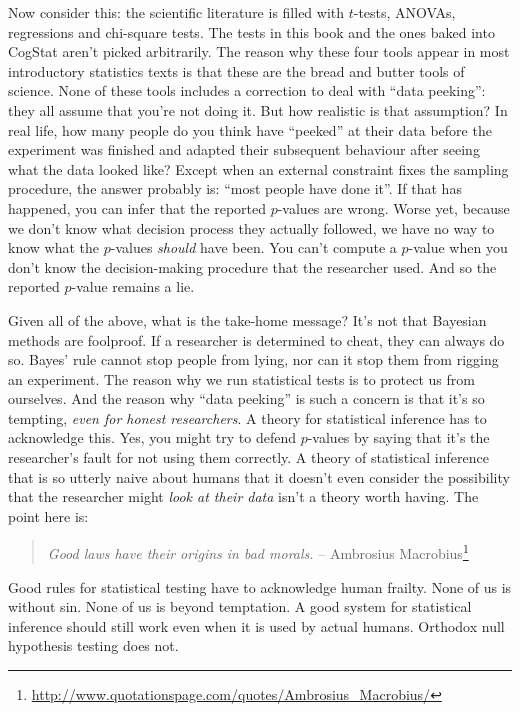 \documentclass[
]{book}
\theoremstyle{definition}
\theoremstyle{definition}
\theoremstyle{definition}
\theoremstyle{definition}
\theoremstyle{remark}
\begin{document}
Now consider this: the scientific literature is filled with \(t\)-tests, ANOVAs, regressions and chi-square tests. The tests in this book and the ones baked into CogStat aren't picked arbitrarily. The reason why these four tools appear in most introductory statistics texts is that these are the bread and butter tools of science. None of these tools includes a correction to deal with ``data peeking'': they all assume that you're not doing it. But how realistic is that assumption? In real life, how many people do you think have ``peeked'' at their data before the experiment was finished and adapted their subsequent behaviour after seeing what the data looked like? Except when an external constraint fixes the sampling procedure, the answer probably is: ``most people have done it''. If that has happened, you can infer that the reported \(p\)-values are wrong. Worse yet, because we don't know what decision process they actually followed, we have no way to know what the \(p\)-values \emph{should} have been. You can't compute a \(p\)-value when you don't know the decision-making procedure that the researcher used. And so the reported \(p\)-value remains a lie.

Given all of the above, what is the take-home message? It's not that Bayesian methods are foolproof. If a researcher is determined to cheat, they can always do so. Bayes' rule cannot stop people from lying, nor can it stop them from rigging an experiment. The reason why we run statistical tests is to protect us from ourselves. And the reason why ``data peeking'' is such a concern is that it's so tempting, \emph{even for honest researchers}. A theory for statistical inference has to acknowledge this. Yes, you might try to defend \(p\)-values by saying that it's the researcher's fault for not using them correctly. A theory of statistical inference that is so utterly naive about humans that it doesn't even consider the possibility that the researcher might \emph{look at their data} isn't a theory worth having. The point here is:

\begin{quote}
\emph{Good laws have their origins in bad morals.}
-- Ambrosius Macrobius\footnote{\url{http://www.quotationspage.com/quotes/Ambrosius_Macrobius/}}
\end{quote}

Good rules for statistical testing have to acknowledge human frailty. None of us is without sin. None of us is beyond temptation. A good system for statistical inference should still work even when it is used by actual humans. Orthodox null hypothesis testing does not.
\end{document}
